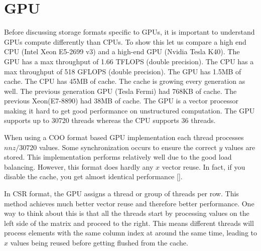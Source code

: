 \section{GPU}
\label{sec:gpu}
Before discussing storage formats specific to GPUs, it is important to understand GPUs compute differently than CPUs. To show this let us compare a high end CPU (Intel Xeon E5-2699 v3) and a high-end GPU (Nvidia Tesla K40). The GPU has a max throughput of 1.66 TFLOPS (double precision). The CPU has a max throughput of 518 GFLOPS (double precision). The GPU has 1.5MB of cache. The CPU has 45MB of cache. The cache is growing every generation as well. The previous generation GPU (Tesla Fermi) had 768KB of cache. The previous Xeon(E7-8890) had 38MB of cache. The GPU is a vector processor making it hard to get good performance on unstructured computation. The GPU supports up to 30720 threads whereas the CPU supports 36 threads. \par
    When using a COO format based GPU implementation each thread processes $nnz/30720$ values. Some synchronization occurs to ensure the correct $y$ values are stored. This implementation performs relatively well due to the good load balancing. However, this format does hardly any $x$ vector reuse. In fact, if you disable the cache, you get almost identical performance [\cite{prelim:bell}].\par
    In CSR format, the GPU assigns a thread or group of threads per row. This method achieves much better vector reuse and therefore better performance. One way to think about this is that all the threads start by processing values on the left side of the matrix and proceed to the right. This means different threads will process elements with the same column index at around the same time, leading to $x$ values being reused before getting flushed from the cache.

